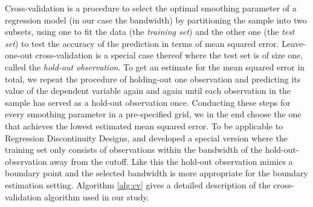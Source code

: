Cross-validation is a procedure to select the optimal smoothing parameter of a regression model (in our case the bandwidth) by partitioning the sample into two subsets, using one to fit the data (the \textit{training set}) and the other one (the \textit{test set}) to test the accuracy of the prediction in terms of mean squared error. Leave-one-out cross-validation is a special case thereof where the test set is of size one, called the \textit{hold-out observation}. To get an estimate for the mean squared error in total, we repeat the procedure of holding-out one observation and predicting its value of the dependent variable again and again until each observation in the sample has served as a hold-out observation once. Conducting these steps for every smoothing parameter in a pre-specified grid, we in the end choose the one that achieves the lowest estimated mean squared error. To be applicable to Regression Discontinuity Designs, \cite{imb_lemieux} and \cite{ludwig_miller} developed a special version where the training set only consists of observations within the bandwidth of the hold-out-observation away from the cutoff. Like this the hold-out observation mimics a boundary point and the selected bandwidth is more appropriate for the boundary estimation setting. Algorithm \ref{alg:cv} gives a detailed description of the cross-validation algorithm used in our study.

